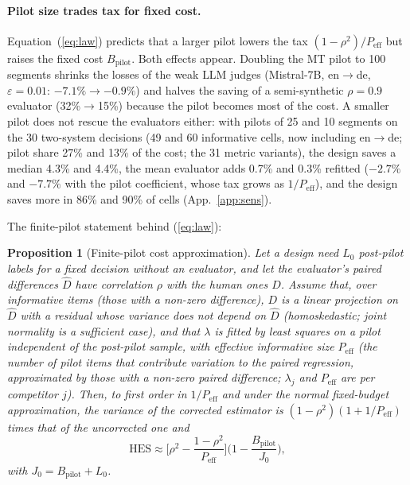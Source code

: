 \documentclass[11pt]{article}
\newtheorem{proposition}{Proposition}
\newcommand{\eps}{\varepsilon}
\newcommand{\HES}{\mathrm{HES}}
\newcommand{\Bp}{B_{\mathrm{pilot}}}
\begin{document}
\paragraph{Pilot size trades tax for fixed cost.} Equation~(\ref{eq:law}) predicts that a larger pilot lowers the tax
$(1-\rho^2)/P_{\mathrm{eff}}$ but raises the fixed cost $\Bp$. Both effects appear. Doubling the MT pilot to 100 segments
shrinks the losses of the weak LLM judges (Mistral-7B, en$\to$de, $\eps=0.01$: $-7.1\%\to-0.9\%$) and halves the saving of a semi-synthetic $\rho=0.9$ evaluator (32\%$\to$15\%) because the
pilot becomes most of the cost. A smaller pilot does not rescue the evaluators either: with pilots of 25 and 10 segments
on the 30 two-system decisions (49 and 60 informative cells, now including en$\to$de; pilot share 27\% and 13\% of the
cost; the 31 metric variants), the design saves a median 4.3\% and 4.4\%, the mean evaluator adds 0.7\% and 0.3\%
refitted ($-2.7\%$ and $-7.7\%$ with the pilot coefficient, whose tax grows as $1/P_{\mathrm{eff}}$), and the design
saves more in 86\% and 90\% of cells (App.~\ref{app:sens}).

The finite-pilot statement behind (\ref{eq:law}):
\begin{proposition}[Finite-pilot cost approximation]\label{prop:law}
Let a design need $L_0$ post-pilot labels for a fixed decision without an evaluator, and let the evaluator's paired
differences $\hat D$ have correlation $\rho$ with the human ones $D$. Assume that, over informative items (those with a
non-zero difference), $D$ is a linear projection on $\hat D$ with a residual whose variance does not depend on $\hat D$
(homoskedastic; joint normality is a sufficient case), and that $\lambda$ is fitted by least squares on
a pilot independent of the post-pilot sample, with effective informative size $P_{\mathrm{eff}}$ (the number of pilot
items that contribute variation to the paired regression, approximated by those with a non-zero paired difference; $\lambda_j$ and $P_{\mathrm{eff}}$ are per competitor $j$). Then, to first order in
$1/P_{\mathrm{eff}}$ and under the normal fixed-budget approximation, the variance of the corrected estimator is
$(1-\rho^2)(1+1/P_{\mathrm{eff}})$ times that of the uncorrected one and
\begin{equation}
\HES\approx\Big[\rho^2-\frac{1-\rho^2}{P_{\mathrm{eff}}}\Big]\Big(1-\frac{\Bp}{J_0}\Big),\label{eq:law-prop}
\end{equation}
with $J_0=\Bp+L_0$.
\end{proposition}
\end{document}
